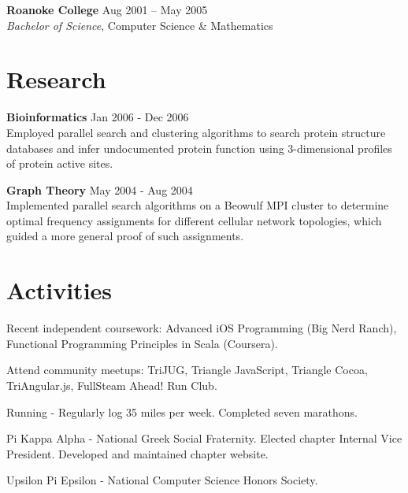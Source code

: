 \documentclass[margin,line]{resume}
\begin{document}
\begin{resume}
  \textbf{Roanoke College}\vspace{2mm} \hfill Aug 2001 -- May 2005\\
  \textsl{Bachelor of Science}, Computer Science \& Mathematics\vspace{-1mm}


  \section{\mysidestyle \textcolor{mySideColor}{Research}}

  \textbf{Bioinformatics} \hfill Jan 2006 - Dec 2006 \vspace{2mm}\\
  Employed parallel search and clustering algorithms to search protein
  structure databases and infer undocumented protein function using
  3-dimensional profiles of protein active sites.

  \textbf{Graph Theory} \hfill May 2004 - Aug 2004 \vspace{2mm}\\
  Implemented parallel search algorithms on a Beowulf MPI cluster to
  determine optimal frequency assignments for different cellular
  network topologies, which guided a more general proof of such
  assignments.



  \section{\mysidestyle \textcolor{mySideColor}{Activities}}

  Recent independent coursework: Advanced iOS Programming (Big Nerd Ranch),
Functional Programming Principles in Scala (Coursera).

  Attend community meetups: TriJUG, Triangle JavaScript, Triangle Cocoa, TriAngular.js,
FullSteam Ahead! Run Club.

  Running - Regularly log 35 miles per week. Completed seven marathons.\vspace{-2mm}

  Pi Kappa Alpha - National Greek Social Fraternity. Elected chapter
  Internal Vice President. Developed and maintained chapter
  website.\vspace{-2mm}

  Upsilon Pi Epsilon - National Computer Science Honors Society.\vspace{-2mm}

\end{resume}
\end{document}
